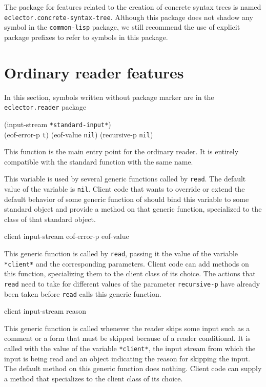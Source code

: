 The package for features related to the creation of concrete syntax
trees is named \texttt{eclector.concrete-syntax-tree}.  Although this
package does not shadow any symbol in the \texttt{common-lisp}
package, we still recommend the use of explicit package prefixes to
refer to symbols in this package.

\section{Ordinary reader features}

In this section, symbols written without package marker are in the
\texttt{eclector.reader} package

 {\optional (input-stream \texttt{*standard-input*})\\
  (eof-error-p \texttt{t})
  (eof-value \texttt{nil})
  (recursive-p \texttt{nil})}

This function is the main entry point for the ordinary reader.  It is
entirely compatible with the standard \commonlisp{} function with the
same name.


This variable is used by several generic functions called by
\texttt{read}.  The default value of the variable is \texttt{nil}.
Client code that wants to override or extend the default behavior of
some generic function of \sysname{} should bind this variable to some
standard object and provide a method on that generic function,
specialized to the class of that standard object.

 {client input-stream eof-error-p eof-value}

This generic function is called by \texttt{read}, passing it the value
of the variable \texttt{*client*} and the corresponding parameters.
Client code can add methods on this function, specializing them to the
client class of its choice.  The actions that \texttt{read} need to
take for different values of the parameter \texttt{recursive-p} have
already been taken before \texttt{read} calls this generic function.

 {client input-stream reason}

This generic function is called whenever the reader skips some input
such as a comment or a form that must be skipped because of a reader
conditional.  It is called with the value of the variable
\texttt{*client*}, the input stream from which the input is being read
and an object indicating the reason for skipping the input.  The
default method on this generic function does nothing.  Client code can
supply a method that specializes to the client class of its choice.

